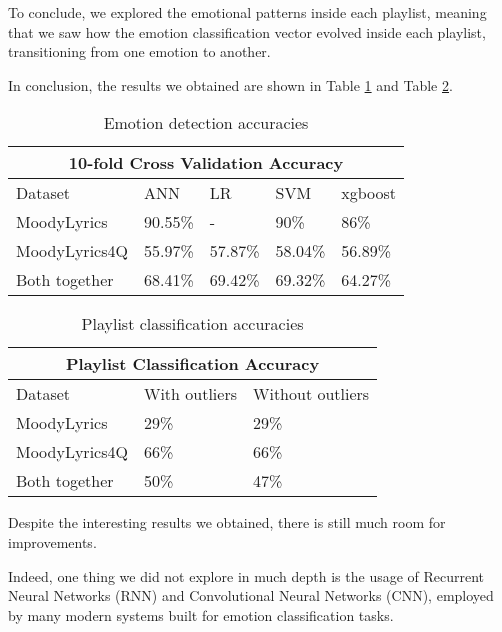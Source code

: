 To conclude, we explored the emotional patterns inside each playlist, meaning that we saw how the emotion
classification vector evolved inside each playlist, transitioning from one emotion to another.

In conclusion, the results we obtained are shown in Table \ref{tab:compar6} and Table \ref{tab:compar62}.

\begin{table}[H]
\centering
\begin{tabular}{ |p{3cm}||p{1.5cm}|p{1.5cm}|p{1.5cm}|p{1.5cm}|  }
 \hline
 \multicolumn{5}{|c|}{10-fold Cross Validation Accuracy} \\
 \hline
 Dataset & ANN & LR &SVM & xgboost\\
 \hline
MoodyLyrics  & 90.55\%    &- &  90\% & 86\%\\
MoodyLyrics4Q  & 55.97\%    &57.87\% &  58.04\% & 56.89\%\\
Both together &   68.41\%  & 69.42\%   &69.32\% &64.27\%\\
\hline
\end{tabular}
\caption{Emotion detection accuracies} \label{tab:compar6}
\end{table}

\begin{table}[H]
\centering
\begin{tabular}{ |p{3cm}||p{1.5cm}|p{1.5cm}| }
 \hline
 \multicolumn{3}{|c|}{Playlist Classification Accuracy} \\
 \hline
Dataset & With outliers & Without outliers\\
 \hline
MoodyLyrics & 29\% & 29\%\\
MoodyLyrics4Q  & 66\%    &66\%\\
Both together &   50\%  & 47\%\\
\hline
\end{tabular}
\caption{Playlist classification accuracies} \label{tab:compar62}
\end{table}



Despite the interesting results we obtained, there is still much room
for improvements.

Indeed, one thing we did not explore in much depth is the usage of Recurrent 
Neural Networks (RNN) and Convolutional Neural Networks (CNN), employed by
many modern systems built for emotion classification tasks.


